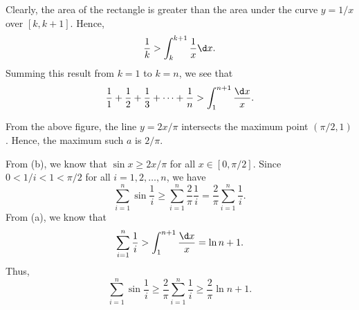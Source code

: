 \begin{solution}
\begin{ppart}
\begin{figure}[H]
        \end{figure}
        Clearly, the area of the rectangle is greater than the area under the curve $y = 1/x$ over $[k, k+1]$. Hence, \[\frac1k > \int_{k}^{k+1} \frac1x \d x.\] Summing this result from $k = 1$ to $k = n$, we see that \[\frac11 + \frac12 + \frac13 + \dots + \frac1n > \int_{1}^{n+1} \frac{\d x}{x}.\]
    \end{ppart}
    \begin{ppart}
        \begin{figure}[H]
        \centering
        \end{figure}
        From the above figure, the line $y = 2x/\pi$ intersects the maximum point $(\pi/2, 1)$. Hence, the maximum such $a$ is $2/\pi$.
    \end{ppart}
    \begin{ppart}
        From (b), we know that $\sin x \geq 2x/\pi$ for all $x \in [0, \pi/2]$. Since $0 < 1/i < 1 < \pi/2$ for all $i = 1, 2, \dots, n$, we have \[\sum_{i = 1}^n \sin \frac1i \geq \sum_{i = 1}^n \frac2\pi \frac1i = \frac2\pi \sum_{i = 1}^n \frac1i.\] From (a), we know that \[\sum_{i = 1}^n \frac1i > \int_1^{n + 1} \frac{\d x}{x} = \ln{n+1}.\] Thus, \[\sum_{i = 1}^n \sin \frac1i \geq \frac2\pi \sum_{i = 1}^n \frac1i \geq \frac2\pi \ln{n+1}.\]


\end{ppart}
\end{solution}
